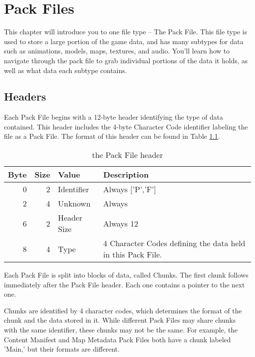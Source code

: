 \chapter{Pack Files}
\label{chap:packfiles}

This chapter will introduce you to one file type -- The Pack File.  This file
type is used to store a large portion of the game data, and has many subtypes
for data such as animations, models, maps, textures, and audio.  You'll learn
how to navigate through the pack file to grab individual portions of the data
it holds, as well as what data each subtype contains.

\section{Headers}
\label{sec:pfheaders}

Each Pack File begins with a 12-byte header identifying the type of data
contained.  This header includes the 4-byte Character Code identifier labeling
the file as a Pack File. The format of this header can be found in Table
\ref{tab:pfheader}.

\begin{table}[htp]\begin{center}
	\caption{the Pack File header}
	\label{tab:pfheader}
	
	\begin{tabular}{|r|r|l|p{2.5in}|}
		\hline
		\textbf{Byte} & \textbf{Size} & \textbf{Value} & \textbf{Description} \\
		\hline
		0 & 2 & Identifier  & Always ['P','F'] \\
		\hline
		2 & 4 & Unknown     & Always \hex{1} \\
		\hline
		6 & 2 & Header Size & Always 12 \\
		\hline
		8 & 4 & Type        & 4 Character Codes defining the data held in this
		                      Pack File. \\
		\hline
	\end{tabular}
\end{center}\end{table}

Each Pack File is split into blocks of data, called Chunks.  The first chunk
follows immediately after the Pack File header.  Each one contains a pointer
to the next one.

Chunks are identified by 4 character codes, which determines the format of the
chunk and the data stored in it.  While different Pack Files may share chunks
with the same identifier, these chunks may not be the same.  For example, the
Content Manifest and Map Metadata Pack Files both have a chunk labeled 'Main,'
but their formats are different.

